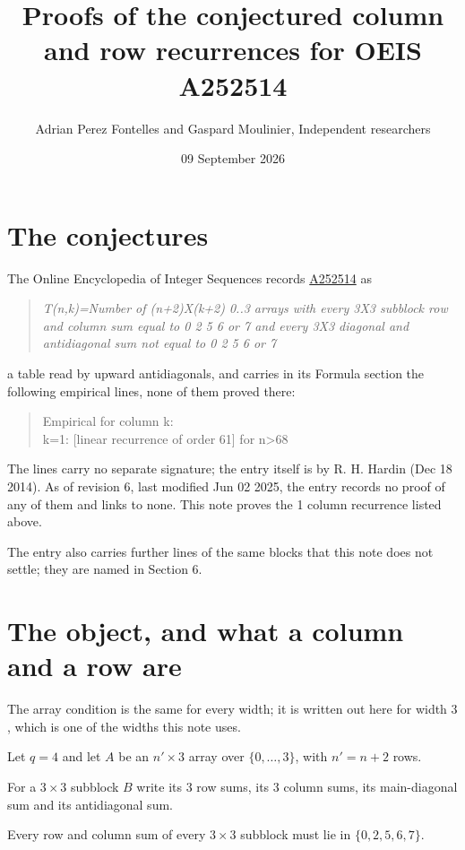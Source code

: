 \documentclass[11pt]{article}
\title{Proofs of the conjectured column and row recurrences for OEIS A252514}
\author{Adrian Perez Fontelles and Gaspard Moulinier, Independent researchers}
\date{09 September 2026}
\theoremstyle{definition}
\begin{document}
\maketitle
\section{The conjectures}

The Online Encyclopedia of Integer Sequences records \href{https://oeis.org/A252514}{A252514} as

\begin{quote}\itshape T(n,k)=Number of (n+2)X(k+2) 0..3 arrays with every 3X3 subblock row and column sum equal to 0 2 5 6 or 7 and every 3X3 diagonal and antidiagonal sum not equal to 0 2 5 6 or 7\end{quote}

a table read by upward antidiagonals, and carries in its Formula section the following empirical lines, none of them proved there:

\begin{quote}\ttfamily Empirical for column k:\\
k=1: [linear recurrence of order 61] for n>68\end{quote}

The lines carry no separate signature; the entry itself is by R. H. Hardin (Dec 18 2014). As of revision 6, last modified Jun 02 2025, the entry records no proof of any of them and links to none. This note proves the 1 column recurrence listed above.

The entry also carries further lines of the same blocks that this note does not settle; they are named in Section 6.

\section{The object, and what a column and a row are}

The array condition is the same for every width; it is written out here for width $3$, which is one of the widths this note uses.

Let $q = 4$ and let $A$ be an $n' \times 3$ array over $\{0,\dots,3\}$, with $n' = n + 2$ rows.

For a $3\times3$ subblock $B$ write its 3 row sums, its 3 column sums, its main-diagonal sum and its antidiagonal sum.

Every row and column sum of every $3\times3$ subblock must lie in $\{0, 2, 5, 6, 7\}$.
\end{document}
